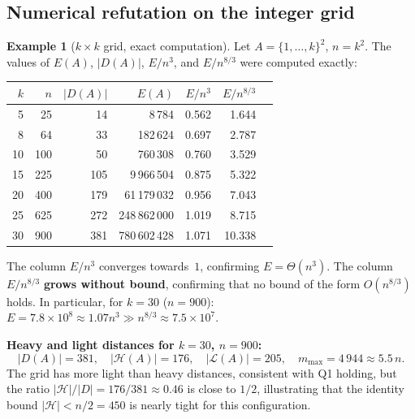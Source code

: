 \documentclass[12pt,a4paper]{amsart}
\theoremstyle{plain}
\theoremstyle{definition}
\newtheorem{example}[theorem]{Example}
\newcommand{\abs}[1]{\left\lvert #1 \right\rvert}
\newcommand{\cL}{\mathcal{L}}
\newcommand{\cH}{\mathcal{H}}
\begin{document}
\subsection{Numerical refutation on the integer grid}
\label{sec:grid_computation}

\begin{example}[$k \times k$ grid, exact computation]
\label{ex:grid_energy}
Let $A = \{1,\ldots,k\}^2$, $n = k^2$.  The values of $E(A)$,
$\abs{D(A)}$, $E/n^3$, and $E/n^{8/3}$ were computed exactly:

\begin{center}
\begin{tabular}{rrrrrrr}
\toprule
$k$ & $n$ & $\abs{D(A)}$ & $E(A)$ & $E/n^3$ & $E/n^{8/3}$\\
\midrule
 5 &    25 &  14 &            8\,784 & 0.562 &  1.644 \\
 8 &    64 &  33 &          182\,624 & 0.697 &  2.787 \\
10 &   100 &  50 &          760\,308 & 0.760 &  3.529 \\
15 &   225 & 105 &        9\,966\,504 & 0.875 &  5.322 \\
20 &   400 & 179 &       61\,179\,032 & 0.956 &  7.043 \\
25 &   625 & 272 &      248\,862\,000 & 1.019 &  8.715 \\
30 &   900 & 381 &      780\,602\,428 & 1.071 & 10.338 \\
\bottomrule
\end{tabular}
\end{center}

\noindent The column $E/n^3$ converges towards~$1$, confirming
$E = \Theta(n^3)$.  The column $E/n^{8/3}$ \textbf{grows without
bound}, confirming that no bound of the form $O(n^{8/3})$ holds.
In particular, for $k = 30$ ($n = 900$): $E = 7.8 \times 10^8 \approx
1.07 n^3 \gg n^{8/3} \approx 7.5 \times 10^7$.

\medskip
\noindent\textbf{Heavy and light distances for $k = 30$, $n = 900$:}
\[
  \abs{D(A)} = 381, \quad \abs{\cH(A)} = 176, \quad \abs{\cL(A)} = 205,
  \quad m_{\max} = 4\,944 \approx 5.5\,n.
\]
The grid has more light than heavy distances, consistent with Q1
holding, but the ratio $\abs{\cH}/\abs{D} = 176/381 \approx 0.46$
is close to $1/2$, illustrating that the identity bound
$\abs{\cH} < n/2 = 450$ is nearly tight for this configuration.
\end{example}

\end{document}

